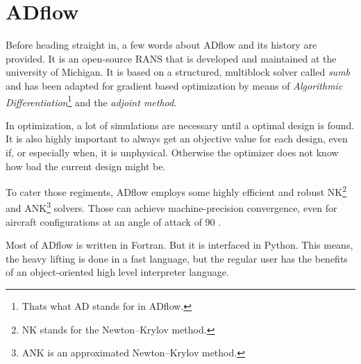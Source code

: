 \section{ADflow}
Before heading straight in, a few words about ADflow and its history are
provided. It is an open-source RANS that is developed and maintained at the
university of Michigan. It is based on a structured, multiblock solver called
\textit{sumb} and has been adapted for gradient based optimization by means of
\textit{Algorithmic Differentiation}\footnote{Thats what AD stands for in
ADflow.} and the \textit{adjoint method}.

In optimization, a lot of simulations are necessary until a optimal design is
found. It is also highly important to always get an objective value for each
design, even if, or especially when, it is unphysical. Otherwise the optimizer
does not know how bad the current design might be.


To cater those regiments, ADflow employs some highly efficient and robust
NK\footnote{NK stands for the Newton–Krylov method.} and ANK\footnote{ANK is an
approximated Newton–Krylov method.} solvers. Those can achieve machine-precision
convergence, even for aircraft configurations at an angle of attack of 90\degree
\cite{Mader2020a} \cite{Kenway2019a} \cite{Yildirim2019b}.


Most of ADflow is written in Fortran. But it is interfaced in Python. This means,
the heavy lifting is done in a fast language, but the regular user has the
benefits of an object-oriented high level interpreter language.
